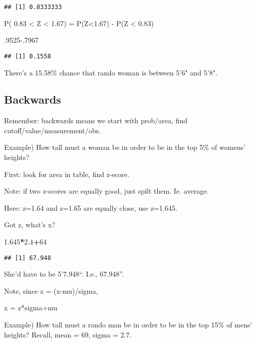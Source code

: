 \documentclass[]{article}
\newenvironment{Shaded}{\begin{snugshade}}{\end{snugshade}}
\newcommand{\DecValTok}[1]{\textcolor[rgb]{0.00,0.00,0.81}{#1}}
\newcommand{\FloatTok}[1]{\textcolor[rgb]{0.00,0.00,0.81}{#1}}
\newcommand{\OperatorTok}[1]{\textcolor[rgb]{0.81,0.36,0.00}{\textbf{#1}}}
\begin{document}
\begin{verbatim}
## [1] 0.8333333
\end{verbatim}

P( 0.83 \textless{} Z \textless{} 1.67) = P(Z\textless{}1.67) - P(Z
\textless{} 0.83)

\begin{Shaded}
\begin{Highlighting}[]
\FloatTok{.9525-.7967}
\end{Highlighting}
\end{Shaded}

\begin{verbatim}
## [1] 0.1558
\end{verbatim}

There's a 15.58\% chance that rando woman is between 5'6" and 5'8".

\hypertarget{backwards}{%
\subsection{Backwards}\label{backwards}}

Remember: backwards means we start with prob/area, find
cutoff/value/measurement/obs.

Example) How tall must a woman be in order to be in the top 5\% of
womens' heights?

First: look for area in table, find z-score.

Note: if two z-scores are equally good, just spilt them. Ie. average.

Here: z=1.64 and z=1.65 are equally close, use z=1.645.

Got z, what's x?

\begin{Shaded}
\begin{Highlighting}[]
\FloatTok{1.645}\OperatorTok{*}\FloatTok{2.4}\OperatorTok{+}\DecValTok{64}
\end{Highlighting}
\end{Shaded}

\begin{verbatim}
## [1] 67.948
\end{verbatim}

She'd have to be 5'7.948``. I.e., 67.948''.

Note, since z = (x-mu)/sigma,

x = z*sigma+mu

Example) How tall must a rando man be in order to be in the top 15\% of
mens' heights? Recall, mean = 69, sigma = 2.7.
\end{document}
